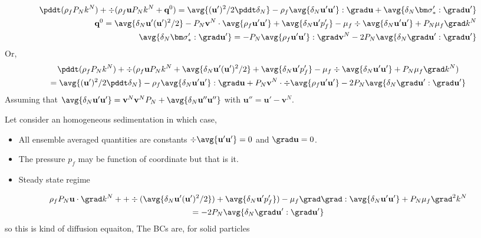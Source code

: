 \begin{align*}
    \pddt(\rho_f P_N k^N )
    + \div (
        \rho_f \textbf{u} P_N k^N 
        + \textbf{q}^0
        )
    =
    \avg{(\textbf{u}')^2/2\pddt \delta_N }
    - \rho_f \avg{\delta_N \textbf{u}'\textbf{u}'}:\grad \textbf{u}
    + \avg{\delta_N\bm\sigma_*' : \grad \textbf{u}'} 
    \\
    \textbf{q}^0 =
    \avg{\delta_N \textbf{u}' (\textbf{u}')^2/2}
    -P_N \textbf{v}^N \cdot  \avg{\rho_f \textbf{u}' \textbf{u}'}
    +\avg{\delta_N \textbf{u}' p_f'} 
    - \mu_f \div \avg{\delta_N \textbf{u}'\textbf{u}'}  + P_N\mu_f  \grad k^N \\
    \avg{\delta_N \bm\sigma_*': \grad \textbf{u}'}
    =
    -P_N \avg{\rho_f \textbf{u}' \textbf{u}'}:\grad \textbf{v}^N 
    - 2  P_N   \avg{ \delta_N \grad \textbf{u}' : \grad \textbf{u}'}
\end{align*}
Or, 
\begin{multline*}
    \pddt(\rho_f P_N k^N )
    + \div (
        \rho_f \textbf{u} P_N k^N 
        + 
        \avg{\delta_N \textbf{u}' (\textbf{u}')^2/2}
    +\avg{\delta_N \textbf{u}' p_f'} 
    - \mu_f \div \avg{\delta_N \textbf{u}'\textbf{u}'}  + P_N\mu_f  \grad k^N
        )\\
    =
    \avg{(\textbf{u}')^2/2\pddt \delta_N }
    - \rho_f \avg{\delta_N \textbf{u}'\textbf{u}'}:\grad \textbf{u}
    + P_N \textbf{v}^N \cdot \div\avg{\rho_f \textbf{u}' \textbf{u}'}
    - 2  P_N   \avg{ \delta_N \grad \textbf{u}' : \grad \textbf{u}'}
\end{multline*}
Assuming that $\avg{\delta_N \textbf{u}'\textbf{u}'} = \textbf{v}^N\textbf{v}^NP_N + \avg{\delta_N \textbf{u}'' \textbf{u}''} $ with $\textbf{u}'' = \textbf{u}' - \textbf{v}^N$. 


Let consider an homogeneous sedimentation in which case, 
\begin{itemize}
    \item All ensemble averaged quantities are constants $\div\avg{\textbf{u}'\textbf{u}'} = 0 $ and $\grad \textbf{u} = 0$. 
    \item The pressure $p_f$ may be function of coordinate but that is it. 
    \item Steady state regime
\end{itemize}
\begin{multline*}
    \rho_fP_N  \textbf{u} \cdot \grad k^N 
    + 
    + \div ( \avg{\delta_N \textbf{u}' (\textbf{u}')^2/2})
    +\avg{\delta_N \textbf{u}' p_f'} )
    - \mu_f \grad\grad : \avg{\delta_N \textbf{u}'\textbf{u}'}  
    + P_N\mu_f  \grad^2 k^N
\\
    =
    - 2  P_N   \avg{ \delta_N \grad \textbf{u}' : \grad \textbf{u}'}
\end{multline*}
so this is kind of diffusion equaiton, 
The BCs are, for solid particles 

